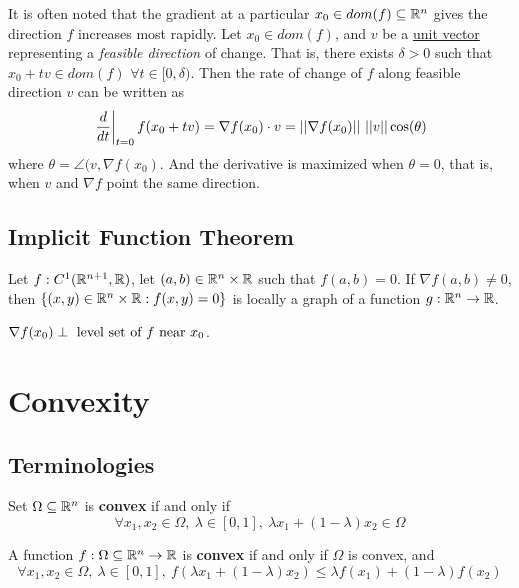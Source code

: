 \documentclass{article}
\begin{document}
    It is often noted that the gradient at a particular $x_0 \in dom(f) \subseteq \mathbb{R}^n$ gives the direction $f$ increases most rapidly.
        Let $x_0 \in dom(f)$, and $v$ be a \ul{unit vector} representing a \emph{feasible direction} of change. That is, there exists $\delta > 0$ such that $x_0 + t v \in dom(f)$ $\forall t \in [0, \delta)$. Then the rate of change of $f$ along feasible direction $v$ can be written as
        \begin{equation}
            \left.\frac{d}{dt}\right\vert_{t=0} f(x_0 + tv) = \nabla f(x_0) \cdot v = \vert \vert {\nabla f(x_0)} \vert \vert\ \vert \vert {v} \vert \vert \cos(\theta)
        \end{equation}
        where $\theta = \angle (v, \nabla f(x_0)$. And the derivative is maximized when $\theta=0$, that is, when $v$ and $\nabla f$ point the same direction.
    
    \subsection{Implicit Function Theorem}
    \begin{theorem}
        Let $f: C^1(\mathbb{R}^{n+1}, \mathbb{R})$, let $(a, b) \in \mathbb{R}^n \times \mathbb{R}$ such that $f(a, b) = 0$. If $\nabla f(a, b) \neq 0$, then $\{(x, y) \in \mathbb{R}^n \times \mathbb{R}:f(x, y) = 0\}$ is locally a graph of a function $g: \mathbb{R}^n \to \mathbb{R}$.
    \end{theorem}
    
    \begin{remark}
        $\nabla f(x_0) \perp \text{{ level set of $f$ near $x_0$}}$.
    \end{remark}
    
    \section{Convexity}
    \subsection{Terminologies}
    \begin{definition}
        Set $\Omega \subseteq \mathbb{R}^n$ is \textbf{convex} if and only if 
        \begin{equation}
            \forall x_1, x_2 \in \Omega,\ \lambda \in [0, 1],\ \lambda x_1 + (1 - \lambda) x_2 \in \Omega
        \end{equation}
    \end{definition}
    
    \begin{definition}
        A function $f: \Omega \subseteq \mathbb{R}^n \to \mathbb{R}$ is \textbf{convex} if and only if $\Omega$ is convex, and 
        \begin{equation}
            \forall x_1, x_2 \in \Omega,\ \lambda \in [0, 1],\ f\left(\lambda x_1 + (1- \lambda) x_2 \right) \leq \lambda f(x_1) + (1 - \lambda) f(x_2)
        \end{equation}
    \end{definition}
    
\end{document}

